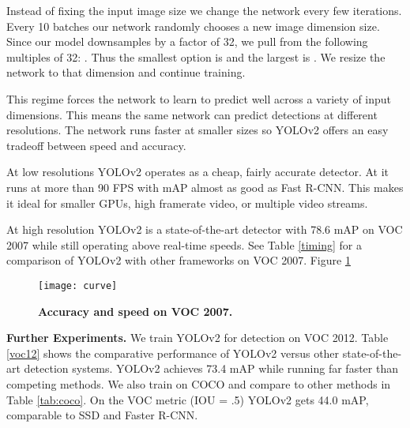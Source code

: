 \documentclass[10pt,twocolumn,letterpaper]{article}
\begin{document}
Instead of fixing the input image size we change the network every few iterations. Every 10 batches our network randomly chooses a new image dimension size. Since our model downsamples by a factor of 32, we pull from the following multiples of 32: . Thus the smallest option is  and the largest is . We resize the network to that dimension and continue training. 

This regime forces the network to learn to predict well across a variety of input dimensions. This means the same network can predict detections at different resolutions. The network runs faster at smaller sizes so YOLOv2 offers an easy tradeoff between speed and accuracy.

At low resolutions YOLOv2 operates as a cheap, fairly accurate detector. At  it runs at more than 90 FPS with mAP almost as good as Fast R-CNN. This makes it ideal for smaller GPUs, high framerate video, or multiple video streams.

At high resolution YOLOv2 is a state-of-the-art detector with 78.6 mAP on VOC 2007 while still operating above real-time speeds. See Table \ref{timing} for a comparison of YOLOv2 with other frameworks on VOC 2007. Figure \ref{curve}

\begin{figure}[t]
      \centering
        \texttt{[image: curve]}
      \caption{\small \textbf{Accuracy and speed on VOC 2007.}}
      \label{curve}
   \end{figure}

\textbf{Further Experiments.} We train YOLOv2 for detection on VOC 2012. Table \ref{voc12} shows the comparative performance of YOLOv2 versus other state-of-the-art detection systems. YOLOv2 achieves 73.4 mAP while running far faster than competing methods. We also train on COCO and compare to other methods in Table \ref{tab:coco}. On the VOC metric (IOU = .5) YOLOv2 gets 44.0 mAP, comparable to SSD and Faster R-CNN.
\end{document}
